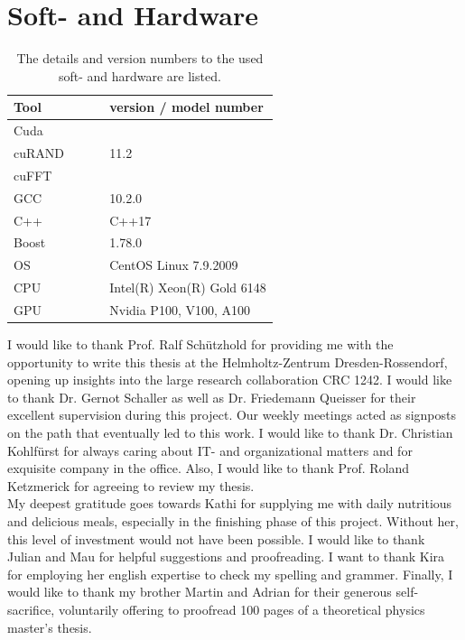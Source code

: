 	\section{Soft- and Hardware}
	\begin{table}[h]
		\centering
		\caption{The details and version numbers to the used soft- and hardware are listed.}
		\renewcommand{\arraystretch}{1.7}
		\begin{tabular}{l l }
			\toprule
			Tool $\qquad \qquad $& version / model number \\
			\midrule
			Cuda &  $~$\\
			cuRAND & 11.2 \\
			cuFFT & $~$\\
			\midrule
			GCC & 10.2.0 \\
			C++ & C++17 \\
			Boost & 1.78.0 \\					
			\midrule
			OS & CentOS Linux 7.9.2009 \\
			CPU & Intel(R) Xeon(R) Gold 6148 \\
			GPU & Nvidia P100, V100, A100 \\
			\bottomrule
		\end{tabular}
		\label{Table::Hardware-Software}
	\end{table}

	
	
	
	\clearpage
	\pagestyle{empty}
	I would like to thank Prof. Ralf Schützhold for providing me with the opportunity to write this thesis at the Helmholtz-Zentrum Dresden-Rossendorf, opening up insights into the large research collaboration CRC 1242. I would like to thank Dr. Gernot Schaller as well as Dr. Friedemann Queisser for their excellent supervision during this project. Our weekly meetings acted as signposts on the path that eventually led to this work. I would like to thank Dr. Christian Kohlfürst for always caring about IT- and organizational matters and for exquisite company in the office. Also, I would like to thank Prof. Roland Ketzmerick for agreeing to review my thesis. \\
	
	My deepest gratitude goes towards Kathi for supplying me with daily nutritious and delicious meals, especially in the finishing phase of this project. Without her, this level of investment would not have been possible.  I would like to thank Julian and Mau for helpful suggestions and proofreading. I want to thank Kira for employing her english expertise to check my spelling and grammer. Finally, I would like to thank my brother Martin and Adrian for their generous self-sacrifice, voluntarily offering to proofread 100 pages of a theoretical physics master's thesis.
	
